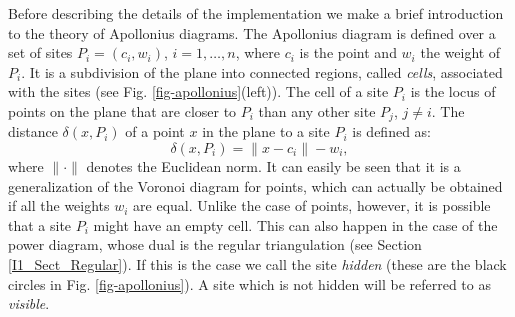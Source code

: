 Before describing the details of the implementation we make a brief
introduction to the theory of Apollonius diagrams.
The Apollonius diagram is defined over a set of sites
$P_i=(c_i,w_i)$, $i=1,\ldots,n$, where $c_i$ is the point and $w_i$
the weight of $P_i$. It is a subdivision of the plane into connected
regions, called {\em cells}, associated with the sites (see
Fig. \ref{fig-apollonius}(left)). The cell of a 
site $P_i$ is the locus of points on the plane that are
closer to $P_i$ than any other site $P_j$, $j\neq i$.
The distance $\delta(x, P_i)$ of a point $x$ in the plane to a
site $P_i$ is defined as: 
\[      \delta(x,P_i)=\|x-c_i\|-w_i,\]
where $\|\cdot\|$ denotes the Euclidean norm.
It can easily be seen that it is a generalization of the Voronoi
diagram for points, which can actually be obtained if all the weights
$w_i$ are equal. Unlike the case of points, however, it is
possible that a site $P_i$ might have an empty cell. This
can also happen in the case of the power diagram, whose dual is the
regular triangulation (see Section \ref{I1_Sect_Regular}). If this is
the case we call the site {\em hidden} (these are the black
circles in Fig. \ref{fig-apollonius}). A site which is not
hidden will be referred to as {\em visible}.

